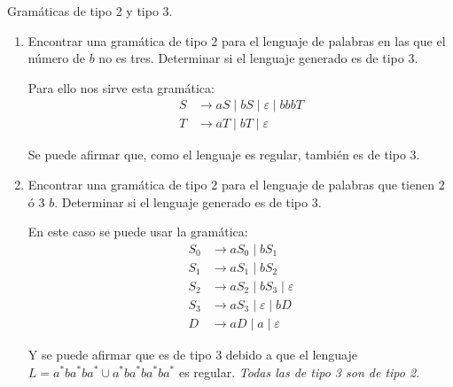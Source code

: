 \documentclass[12pt]{book} %
\begin{document}
\begin{ejercicio}
Gramáticas de tipo 2 y tipo 3. 

\begin{enumerate}[label=\alph*)]
    \item Encontrar una gramática de tipo 2 para el lenguaje de palabras en las que el número de $b$ no es tres.  
        Determinar si el lenguaje generado es de tipo 3.

        \begin{solucion}[a]

        Para ello nos sirve esta gramática:
        \begin{align*}
        S &\to aS \mid bS \mid \varepsilon \mid bbbT \\
        T &\to aT \mid bT \mid \varepsilon
        \end{align*}

        Se puede afirmar que, como el lenguaje es regular, también es de tipo 3.

        \end{solucion}

    \item Encontrar una gramática de tipo 2 para el lenguaje de palabras que tienen 2 ó 3 $b$.  
        Determinar si el lenguaje generado es de tipo 3.

        \begin{solucion}[b]

        En este caso se puede usar la gramática:
        \begin{align*}
        S_0 &\to aS_0 \mid bS_1 \\
        S_1 &\to aS_1 \mid bS_2 \\
        S_2 &\to aS_2 \mid bS_3 \mid \varepsilon \\
        S_3 &\to aS_3 \mid \varepsilon \mid bD \\
        D &\to aD \mid a \mid \varepsilon
        \end{align*}

        Y se puede afirmar que es de tipo 3 debido a que el lenguaje $L = a^{*}b a^{*}b a^{*} \cup a^{*}b a^{*}b a^{*}b a^{*}$ es regular. \textit{Todas las de tipo 3 son de tipo 2.}

        \end{solucion}


\end{enumerate}

\end{ejercicio}
\end{document}

